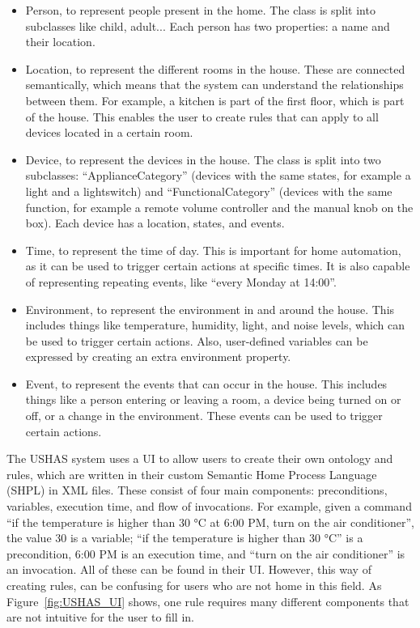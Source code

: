 \documentclass[11pt,a4paper]{report}
\begin{document}
\begin{itemize} 
    \item Person, to represent people present in the home. The class is split into subclasses like child, adult... Each person has two properties: a name and their location. 
    \item Location, to represent the different rooms in the house. These are connected semantically, which means that the system can understand the relationships between them. For example, a kitchen is part of the first floor, which is part of the house. This enables the user to create rules that can apply to all devices located in a certain room. 
    \item Device, to represent the devices in the house. The class is split into two subclasses: ``ApplianceCategory'' (devices with the same states, for example a light and a lightswitch) and ``FunctionalCategory'' (devices with the same function, for example a remote volume controller and the manual knob on the box). Each device has a location, states, and events. 
    \item Time, to represent the time of day. This is important for home automation, as it can be used to trigger certain actions at specific times. It is also capable of representing repeating events, like ``every Monday at 14:00''. 
    \item Environment, to represent the environment in and around the house. This includes things like temperature, humidity, light, and noise levels, which can be used to trigger certain actions. Also, user-defined variables can be expressed by creating an extra environment property. 
    \item Event, to represent the events that can occur in the house. This includes things like a person entering or leaving a room, a device being turned on or off, or a change in the environment. These events can be used to trigger certain actions. 
\end{itemize}

The USHAS system uses a UI to allow users to create their own ontology and rules, which are written in their custom Semantic Home Process Language (SHPL) in XML files. These consist of four main components: preconditions, variables, execution time, and flow of invocations. For example, given a command ``if the temperature is higher than 30 °C at 6:00 PM, turn on the air conditioner'', the value 30 is a variable; ``if the temperature is higher than 30 °C'' is a precondition, 6:00 PM is an execution time, and ``turn on the air conditioner'' is an invocation. All of these can be found in their UI. However, this way of creating rules, can be confusing for users who are not home in this field. As Figure~\ref{fig:USHAS_UI} shows, one rule requires many different components that are not intuitive for the user to fill in.
\end{document}
